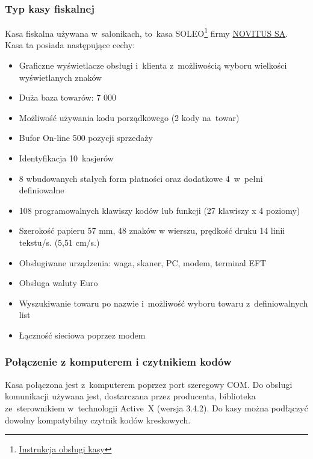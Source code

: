 \subsubsection{Typ kasy fiskalnej}
\begin{description}

\item Kasa fiskalna używana w~salonikach, to~kasa SOLEO\footnote{\href{http://www.novitus.pl/pl/cok/download/instrukcje-obslugi/instr_obslugi_soleo_v18.pdf} {Instrukcja obsługi kasy}}  firmy \href{http://www.novitus.pl/pl} {NOVITUS SA}. Kasa ta posiada następujące cechy:	
\begin{itemize}
\item Graficzne wyświetlacze obsługi i~klienta z~możliwością wyboru wielkości wyświetlanych znaków
\item Duża baza towarów: 7 000
\item Możliwość używania kodu porządkowego (2 kody na~towar)
\item Bufor On-line 500 pozycji sprzedaży
\item Identyfikacja 10~kasjerów
\item 8 wbudowanych stałych form płatności oraz dodatkowe 4~w~pełni definiowalne
\item 108 programowalnych klawiszy kodów lub funkcji (27 klawiszy x 4 poziomy)
\item Szerokość papieru 57 mm, 48 znaków w wierszu, prędkość druku 14 linii tekstu/s. (5,51 cm/s.)
\item Obsługiwane urządzenia: waga, skaner, PC, modem, terminal EFT
\item Obsługa waluty Euro
\item Wyszukiwanie towaru po nazwie i~możliwość wyboru towaru z~definiowalnych list
\item Łączność sieciowa poprzez modem
\end{itemize} 
\end{description}
\subsubsection{Połączenie z komputerem i czytnikiem kodów}
Kasa połączona jest z~komputerem poprzez port szeregowy COM. Do obsługi komunikacji używana jest, dostarczana przez producenta, biblioteka ze~sterownikiem w~technologii Active~X (wersja 3.4.2). Do kasy można podłączyć dowolny kompatybilny czytnik kodów kreskowych.
